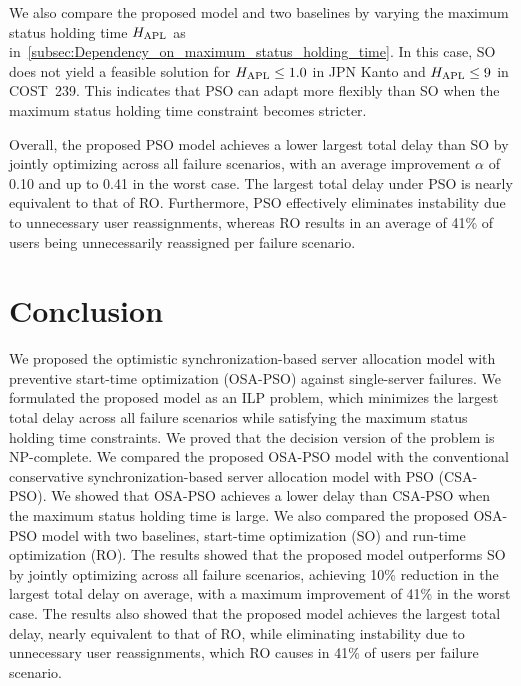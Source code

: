 \documentclass[10pt, letterpaper]{IEEEtran}
\begin{document}
\begin{CJK}{UTF8}{ipxm}
We also compare the proposed model and two baselines by varying the maximum status holding time $H_{\rm APL}$ as in~\ref{subsec:Dependency_on_maximum_status_holding_time}.
In this case, SO does not yield a feasible solution for $H_{\rm APL} \leq 1.0$ in JPN Kanto and $H_{\rm APL} \leq 9$ in COST~239.
This indicates that PSO can adapt more flexibly than SO when the maximum status holding time constraint becomes stricter.

Overall, the proposed PSO model achieves a lower largest total delay than SO by jointly optimizing across all failure scenarios, with an average improvement $\alpha$ of 0.10 and up to 0.41 in the worst case.
The largest total delay under PSO is nearly equivalent to that of RO.
Furthermore, PSO effectively eliminates instability due to unnecessary user reassignments, whereas RO results in an average of 41\% of users being unnecessarily reassigned per failure scenario.

\section{Conclusion}
\label{sec:conclusion}

We proposed the optimistic synchronization-based server allocation model with preventive start-time optimization (OSA-PSO) against single-server failures.
We formulated the proposed model as an ILP problem, which minimizes the largest total delay across all failure scenarios while satisfying the maximum status holding time constraints.
We proved that the decision version of the problem is NP-complete.
We compared the proposed OSA-PSO model with the conventional conservative synchronization-based server allocation model with PSO (CSA-PSO). We showed that OSA-PSO achieves a lower delay than CSA-PSO when the maximum status holding time is large.
We also compared the proposed OSA-PSO model with two baselines, start-time optimization (SO) and run-time optimization (RO).
The results showed that the proposed model outperforms SO by jointly optimizing across all failure scenarios, achieving 10\% reduction in the largest total delay on average, with a maximum improvement of 41\% in the worst case.
The results also showed that the proposed model achieves the largest total delay, nearly equivalent to that of RO, while eliminating instability due to unnecessary user reassignments, which RO causes in 41\% of users per failure scenario.



\end{CJK}
\end{document}
